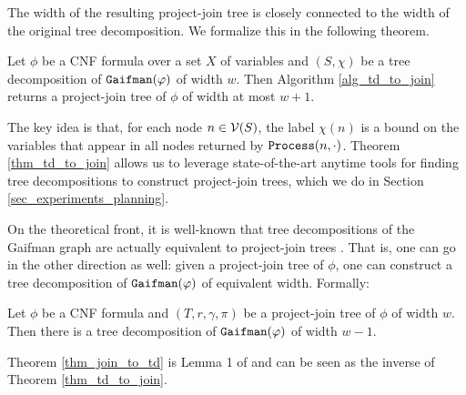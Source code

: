 The width of the resulting project-join tree is closely connected to the width of the original tree decomposition.
We formalize this in the following theorem.
\begin{theorem}
\label{thm_td_to_join}
	Let $\phi$ be a CNF formula over a set $X$ of variables and $(S, \chi)$ be a tree decomposition of $\texttt{\upshape Gaifman}(\varphi)$ of width $w$.
    Then Algorithm \ref{alg_td_to_join} returns a project-join tree of $\phi$ of width at most $w+1$.
\end{theorem}
The key idea is that, for each node $n \in \mathcal{V}(S)$, the label $\chi(n)$ is a bound on the variables that appear in all nodes returned by $\texttt{\upshape Process}(n, \cdot)$.
Theorem \ref{thm_td_to_join} allows us to leverage state-of-the-art anytime tools for finding tree decompositions \cite{Tamaki17,strasser2017computing,AMW17} to construct project-join trees, which we do in Section \ref{sec_experiments_planning}.

On the theoretical front, it is well-known that tree decompositions of the Gaifman graph are actually equivalent to project-join trees \cite{MPPV04}.
That is, one can go in the other direction as well: given a project-join tree of $\phi$, one can construct a tree decomposition of $\texttt{\upshape Gaifman}(\varphi)$ of equivalent width.
Formally:
\begin{theorem}
\label{thm_join_to_td}
    Let $\phi$ be a CNF formula and $(T, r, \gamma, \pi)$ be a project-join tree of $\phi$ of width $w$.
    Then there is a tree decomposition of $\texttt{\upshape Gaifman}(\varphi)$ of width $w-1$.
\end{theorem}
Theorem \ref{thm_join_to_td} is Lemma 1 of \cite{MPPV04} and can be seen as the inverse of Theorem \ref{thm_td_to_join}.
